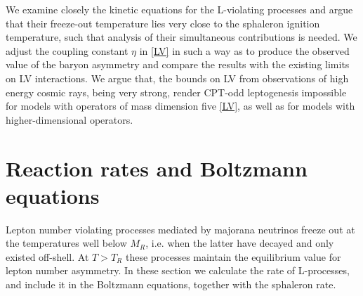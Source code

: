 \documentclass[12pt]{revtex4}
\begin{document}
	We examine closely the kinetic equations for the L-violating processes and argue that
	their freeze-out temperature lies very close to the sphaleron ignition temperature, such
	that analysis of their simultaneous contributions is needed. 
	We adjust the coupling constant $ \eta $ in \eqref{LV} in such a way as to produce 
	the observed value of the baryon asymmetry and compare the results with the existing
	limits on LV interactions. 
	We argue that, the bounds on LV from observations of high energy cosmic rays, being
	very strong, render CPT-odd leptogenesis impossible for models with operators of 
	mass dimension five \eqref{LV}, 
	as well as for models with higher-dimensional operators.
	

%
%
\section{Reaction rates and Boltzmann equations}

	Lepton number violating processes mediated by majorana neutrinos 
	freeze out at the temperatures well below $ M_R $, i.e. when the latter have decayed
	and only existed off-shell.
	At $ T > T_R $ these processes maintain the equilibrium value for 
	lepton number asymmetry. 
	In these section we calculate the rate of L-processes, and include it
	in the Boltzmann equations, together with the sphaleron rate.
\end{document}
